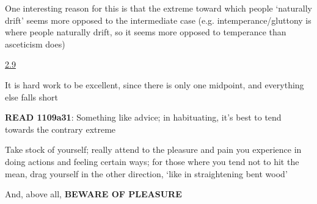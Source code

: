 \documentclass[11pt]{article}
\begin{document}
\noindent One interesting reason for this is that the extreme toward which people `naturally drift' seems more opposed to the intermediate case (e.g. intemperance/gluttony is where people naturally drift, so it seems more opposed to temperance than asceticism does)
\vspace*{4mm}

\noindent\underline{2.9}
\vspace*{2mm}

\noindent It is hard work to be excellent, since there is only one midpoint, and everything else falls short
\vspace*{2mm}

\noindent\textbf{READ 1109a31}: Something like advice; in habituating, it's best to tend towards the contrary extreme
\vspace*{2mm}

\noindent Take stock of yourself; really attend to the pleasure and pain you experience in doing actions and feeling certain ways; for those where you tend not to hit the mean, drag yourself in the other direction, `like in straightening bent wood'
\vspace*{2mm}

\noindent And, above all, \textbf{BEWARE OF PLEASURE}
\vspace*{2mm}
\end{document}
